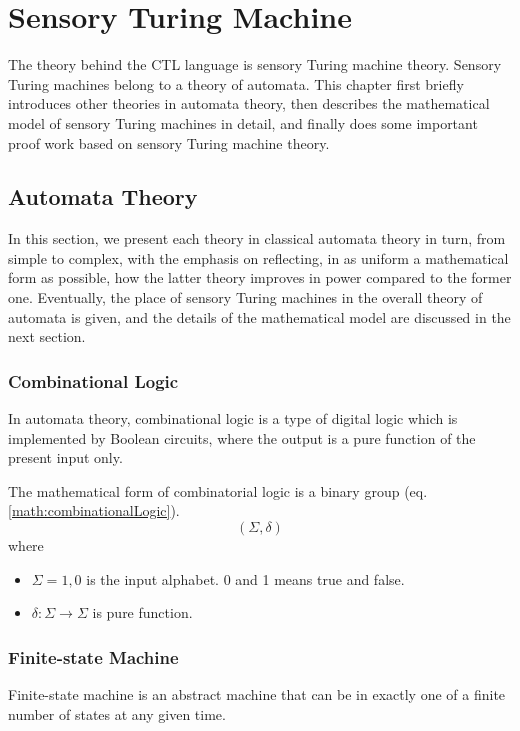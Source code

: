 \chapter{Sensory Turing Machine}\label{chapter:SenseTuringMachine}

The theory behind the CTL language is sensory Turing machine theory. Sensory Turing machines belong to a theory of automata. This chapter first briefly introduces other theories in automata theory, then describes the mathematical model of sensory Turing machines in detail, and finally does some important proof work based on sensory Turing machine theory.
\section{Automata Theory}
In this section, we present each theory in classical automata theory in turn, from simple to complex, with the emphasis on reflecting, in as uniform a mathematical form as possible, how the latter theory improves in power compared to the former one. Eventually, the place of sensory Turing machines in the overall theory of automata is given, and the details of the mathematical model are discussed in the next section.
\subsection{Combinational Logic}
In automata theory, combinational logic is a type of digital logic which is implemented by Boolean circuits, where the output is a pure function of the present input only.

The mathematical form of combinatorial logic is a binary group (eq. \ref{math:combinationalLogic}).
\begin{equation} \label{math:combinationalLogic}
    (\Sigma, \delta)
\end{equation}
where
\begin{itemize}
    \item $\Sigma = {1, 0}$ is the input alphabet. 0 and 1 means true and false.
    \item $\delta: \Sigma \to \Sigma$ is pure function.
\end{itemize}

\subsection{Finite-state Machine}
Finite-state machine is an abstract machine that can be in exactly one of a finite number of states at any given time.

